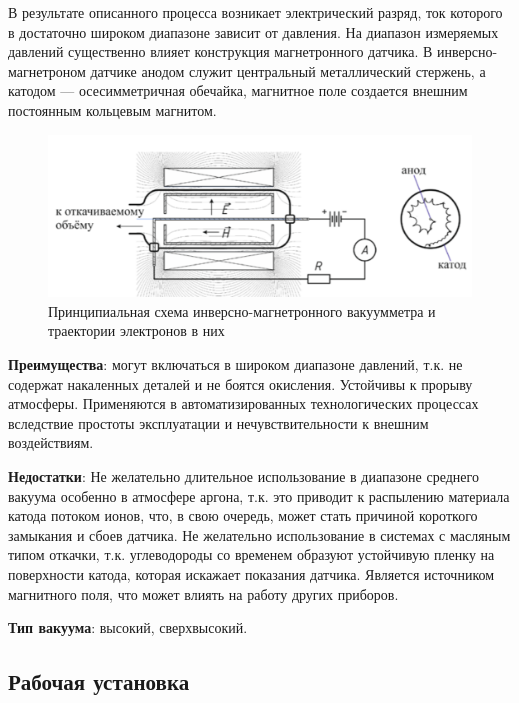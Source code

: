 \documentclass[a4paper,12pt]{article}
\begin{document}
В результате описанного процесса возникает электрический разряд, ток которого в достаточно широком диапазоне зависит от давления.
На диапазон измеряемых давлений существенно влияет конструкция магнетронного датчика. В инверсно-магнетроном датчике анодом служит центральный металлический стержень, а катодом — осесимметричная
обечайка, магнитное поле создается внешним постоянным кольцевым
магнитом.

\begin{figure}[h]
    \centering
    \includegraphics[width = 13 cm]{Магнетрон}
    \caption{Принципиальная схема инверсно-магнетронного вакуумметра и траектории электронов в них}
    \label{fig:vac}
\end{figure}

\textbf{Преимущества}: могут включаться в широком диапазоне давлений, т.к. не содержат накаленных деталей и не боятся окисления. Устойчивы к прорыву атмосферы. Применяются в автоматизированных технологических процессах вследствие простоты эксплуатации
и нечувствительности к внешним воздействиям.

\textbf{Недостатки}: Не желательно длительное использование в диапазоне среднего вакуума особенно в атмосфере аргона, т.к. это приводит к распылению материала катода потоком ионов, что, в свою очередь, может стать причиной короткого замыкания и сбоев датчика. Не желательно использование в системах с масляным типом откачки, т.к. углеводороды со временем образуют устойчивую пленку на поверхности катода, которая искажает показания датчика. Является источником магнитного поля, что может влиять на работу других приборов.

\textbf{Тип вакуума}: высокий, сверхвысокий.

\subsection{Рабочая установка}
\end{document}
